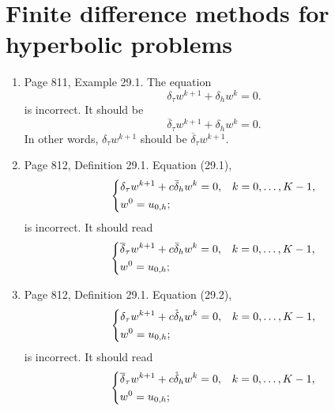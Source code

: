 \documentclass{book}
\begin{document}
	
	\chapter{Finite difference methods for hyperbolic problems}
	
	\begin{enumerate}
	
	\item
Page 811, Example 29.1.  The equation
	\[
\delta_\tau w^{k+1} + \delta_h w^k = 0.
	\]
is incorrect. It should be 
  \[
\overline{\delta}_\tau w^{k+1} + \delta_h w^k = 0.
  \]
In other words, $\delta_\tau w^{k+1}$ should be $\overline{\delta}_\tau w^{k+1}$.


	\item
Page 812, Definition 29.1. Equation (29.1),
  \begin{equation*}
    \begin{dcases}
      \delta_\tau w^{k+1} + c \bar\delta_h w^k = 0, & k = 0, \ldots, K-1, \\
      w^0 = u_{0,h};
    \end{dcases}
  \end{equation*}
is incorrect. It should read
  \begin{equation*}
    \begin{dcases}
\overline\delta_\tau w^{k+1} + c \bar\delta_h w^k = 0, & k = 0, \ldots, K-1, \\
      w^0 = u_{0,h};
    \end{dcases}
  \end{equation*}
  
  	\item
Page 812, Definition 29.1. Equation (29.2),
  \begin{equation*}
    \begin{dcases}
      \delta_\tau w^{k+1} + c \mathring\delta_h w^k = 0, & k = 0, \ldots, K-1, \\
      w^0 = u_{0,h};
    \end{dcases}
  \end{equation*}
is incorrect. It should read  
	\begin{equation*}
    \begin{dcases}
\overline\delta_\tau w^{k+1} + c \mathring\delta_h w^k = 0, & k = 0, \ldots, K-1, \\
      w^0 = u_{0,h};
    \end{dcases}
  \end{equation*}
  

\end{enumerate}
\end{document}
